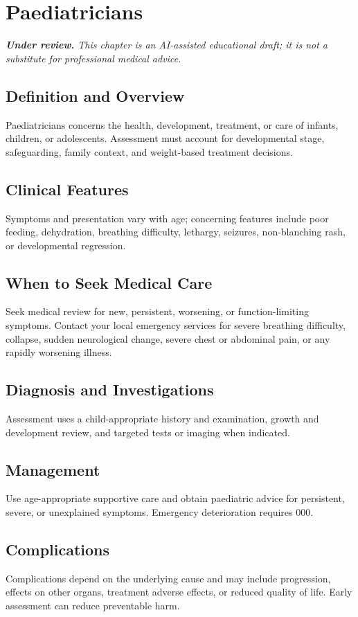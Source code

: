 \chapter{Paediatricians}

\medskip
\noindent\textit{\textbf{Under review.} This chapter is an AI-assisted educational draft; it is not a substitute for professional medical advice.}

\section*{Definition and Overview}
Paediatricians concerns the health, development, treatment, or care of infants, children, or adolescents. Assessment must account for developmental stage, safeguarding, family context, and weight-based treatment decisions.

\section*{Clinical Features}
Symptoms and presentation vary with age; concerning features include poor feeding, dehydration, breathing difficulty, lethargy, seizures, non-blanching rash, or developmental regression.

\section*{When to Seek Medical Care}
Seek medical review for new, persistent, worsening, or function-limiting symptoms. Contact your local emergency services for severe breathing difficulty, collapse, sudden neurological change, severe chest or abdominal pain, or any rapidly worsening illness.

\section*{Diagnosis and Investigations}
Assessment uses a child-appropriate history and examination, growth and development review, and targeted tests or imaging when indicated.

\section*{Management}
Use age-appropriate supportive care and obtain paediatric advice for persistent, severe, or unexplained symptoms. Emergency deterioration requires 000.

\section*{Complications}
Complications depend on the underlying cause and may include progression, effects on other organs, treatment adverse effects, or reduced quality of life. Early assessment can reduce preventable harm.

